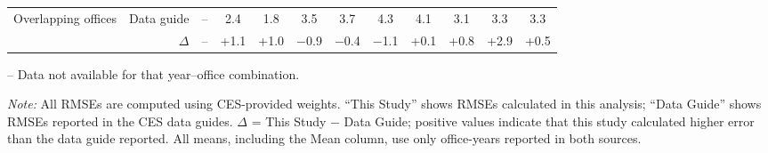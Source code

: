 \begin{table}[p]
{\begin{threeparttable}
\begin{tabular}{lrcccccccccc}
Overlapping offices & Data guide & -- & 2.4 & 1.8 & 3.5 & 3.7 & 4.3 & 4.1 & 3.1 & 3.3 & 3.3 \\
 & $\Delta$ & -- & +1.1 & +1.0 & $-$0.9 & $-$0.4 & $-$1.1 & +0.1 & +0.8 & +2.9 & +0.5 \\
\bottomrule
\end{tabular}
\begin{tablenotes}
\footnotesize
\item -- Data not available for that year--office combination.
\item \textit{Note:} All RMSEs are computed using CES-provided weights. ``This Study'' shows RMSEs calculated in this analysis; ``Data Guide'' shows RMSEs reported in the CES data guides. $\Delta$ = This Study $-$ Data Guide; positive values indicate that this study calculated higher error than the data guide reported. All means, including the Mean column, use only office-years reported in both sources.
\end{tablenotes}
\end{threeparttable}%
}
\end{table}